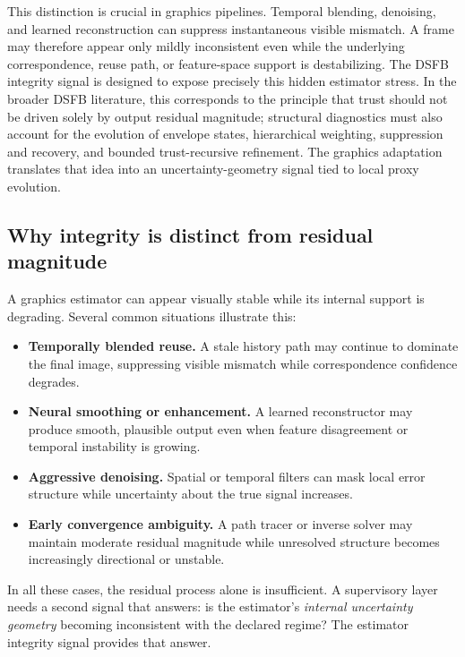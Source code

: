 \documentclass[11pt]{article}
\theoremstyle{definition}
\theoremstyle{plain}
\begin{document}
This distinction is crucial in graphics pipelines. Temporal blending, denoising, and learned reconstruction can suppress instantaneous visible mismatch. A frame may therefore appear only mildly inconsistent even while the underlying correspondence, reuse path, or feature-space support is destabilizing. The DSFB integrity signal is designed to expose precisely this hidden estimator stress. In the broader DSFB literature, this corresponds to the principle that trust should not be driven solely by output residual magnitude; structural diagnostics must also account for the evolution of envelope states, hierarchical weighting, suppression and recovery, and bounded trust-recursive refinement. The graphics adaptation translates that idea into an uncertainty-geometry signal tied to local proxy evolution. 


\subsection{Why integrity is distinct from residual magnitude}

A graphics estimator can appear visually stable while its internal support is degrading. Several common situations illustrate this:

\begin{itemize}[leftmargin=1.5em]
    \item \textbf{Temporally blended reuse.} A stale history path may continue to dominate the final image, suppressing visible mismatch while correspondence confidence degrades.
    \item \textbf{Neural smoothing or enhancement.} A learned reconstructor may produce smooth, plausible output even when feature disagreement or temporal instability is growing.
    \item \textbf{Aggressive denoising.} Spatial or temporal filters can mask local error structure while uncertainty about the true signal increases.
    \item \textbf{Early convergence ambiguity.} A path tracer or inverse solver may maintain moderate residual magnitude while unresolved structure becomes increasingly directional or unstable.
\end{itemize}

In all these cases, the residual process alone is insufficient. A supervisory layer needs a second signal that answers: is the estimator’s \emph{internal uncertainty geometry} becoming inconsistent with the declared regime? The estimator integrity signal provides that answer.
\end{document}
